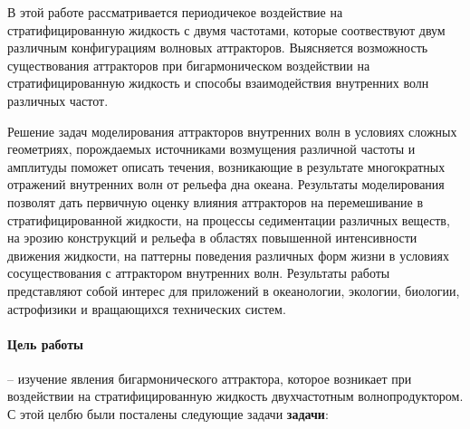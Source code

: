 \documentclass[utf8x]{G7-32} %
\begin{document}
В этой работе рассматривается периодичекое воздействие на стратифицированную жидкость с двумя частотами, которые соотвествуют двум различным конфигурациям волновых аттракторов. Выясняется возможность существования аттракторов при бигармоническом воздействии на стратифицированную жидкость и способы взаимодействия внутренних волн различных частот. 

Решение задач моделирования аттракторов внутренних волн в условиях сложных геометриях, порождаемых источниками возмущения различной частоты и амплитуды поможет описать течения, возникающие в результате многократных отражений внутренних волн от рельефа дна океана. Результаты моделирования позволят дать первичную оценку влияния аттракторов на перемешивание в стратифицированной жидкости, на процессы седиментации различных веществ, на эрозию конструкций и рельефа в областях повышенной интенсивности движения жидкости, на паттерны поведения различных форм жизни в условиях сосуществования с аттрактором внутренних волн. Результаты работы представляют собой интерес для приложений в океанологии, экологии, биологии, астрофизики и вращающихся технических систем. 

\paragraph{Цель работы} -- изучение явления бигармонического аттрактора, которое возникает при воздействии на стратифицированную жидкость двухчастотным волнопродуктором.  
С этой целбю были посталены следующие задачи \textbf{задачи}:
\end{document}
